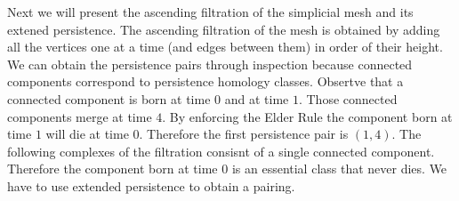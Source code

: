 Next we will present the ascending filtration of the simplicial mesh and its extened persistence. The ascending filtration of the mesh is obtained by adding all the vertices one at a time (and edges between them) in order of their height. We can obtain the persistence pairs through inspection because connected components correspond to persistence homology classes. Obsertve that a connected component is born at time $0$ and at time $1$. Those connected components merge at time $4$. By enforcing the Elder Rule the component born at time $1$ will die at time $0$. Therefore the first persistence pair is $(1, 4)$. The following complexes of the filtration consisnt of a single connected component. Therefore the component born at time $0$ is an essential class that never dies. We have to use extended persistence to obtain a pairing.

